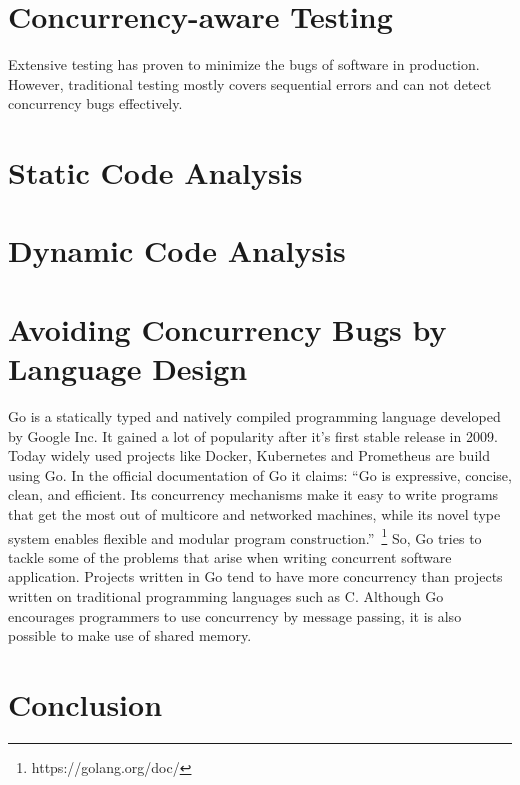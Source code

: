 \documentclass[conference]{IEEEtran}
\begin{document}
\section{Concurrency-aware Testing}
Extensive testing has proven to minimize the bugs of software in production.\cite{makinen2014testing}
However, traditional testing mostly covers sequential errors and can not detect concurrency bugs effectively.\cite{lu2008mistakes}

\section{Static Code Analysis}


\section{Dynamic Code Analysis}


\section{Avoiding Concurrency Bugs by Language Design}
Go is a statically typed and natively compiled programming language developed by Google Inc.
It gained a lot of popularity after it's first stable release in 2009.
Today widely used projects like Docker, Kubernetes and Prometheus are build using Go.
In the official documentation of Go it claims: ``Go is expressive, concise, clean, and efficient. Its concurrency mechanisms make it easy to write programs that get the most out of multicore and networked machines, while its novel type system enables flexible and modular program construction.''~\footnote{https://golang.org/doc/}
So, Go tries to tackle some of the problems that arise when writing concurrent software application.
Projects written in Go tend to have more concurrency than projects written on traditional programming languages such as C.\cite{tu2019go}
Although Go encourages programmers to use concurrency by message passing, it is also possible to make use of shared memory.


\section{Conclusion}



\end{document}
